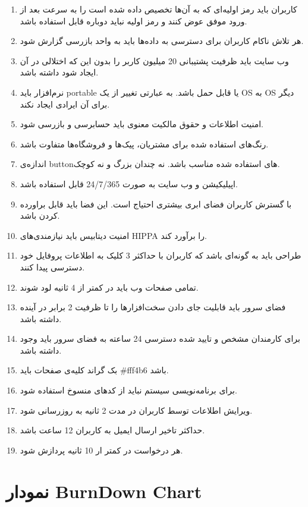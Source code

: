 \documentclass[]{article}
\begin{document}
\begin{enumerate}
\def\labelenumi{\arabic{enumi})}
\item
  کاربران باید رمز اولیه‌ای که به آن‌ها تخصیص داده شده است را به سرعت
  بعد از ورود موفق عوض کنند و رمز اولیه نباید دوباره قابل استفاده باشد.
\item
  هر تلاش ناکام کاربران برای دسترسی به داده‌ها باید به واحد بازرسی گزارش
  شود.
\item
  وب سایت باید ظرفیت پشتیبانی 20 میلیون کاربر را بدون این که اختلالی در
  آن ایجاد شود داشته باشد.
\item
  نرم‌افزار باید portable یا قابل حمل باشد. به عبارتی تغییر از یک OS به
  OS دیگر برای آن ایرادی ایجاد نکند.
\item
  امنیت اطلاعات و حقوق مالکیت معنوی باید حسابرسی و بازرسی شود.
\item
  رنگ‌های استفاده شده برای مشتریان، پیک‌ها و فروشگاه‌ها متفاوت باشد.
\item
  اندازه‌ی buttonهای استفاده شده مناسب باشد. نه چندان بزرگ و نه کوچک.
\item
  اپیلیکیشن و وب سایت به صورت 24/7/365 قابل استفاده باشد.
\item
  با گسترش کاربران فضای ابری بیشتری احتیاج است. این فضا باید قابل
  براورده کردن باشد.
\item
  امنیت دیتابیس باید نیازمندی‌های HIPPA را برآورد کند.
\item
  طراحی باید به گونه‌ای باشد که کاربران با حداکثر 3 کلیک به اطلاعات
  پروفایل خود دسترسی پیدا کنند.
\item
  تمامی صفحات وب باید در کمتر از 4 ثانیه لود شوند.
\item
  فضای سرور باید قابلیت جای دادن سخت‌افزارها را تا ظرفیت 2 برابر در
  آینده داشته باشد.
\item
  برای کارمندان مشخص و تایید شده دسترسی 24 ساعته به فضای سرور باید وجود
  داشته باشد.
\item
  بک گراند کلیه‌ی صفحات باید \#fff4b6 باشد.
\item
  برای برنامه‌نویسی سیستم نباید از کدهای منسوخ استفاده شود.
\item
  ویرایش اطلاعات توسط کاربران در مدت 2 ثانیه به روزرسانی شود.
\item
  حداکثر تاخیر ارسال ایمیل به کاربران 12 ساعت باشد.
\item
  هر درخواست در کمتر ار 10 ثانیه پردازش شود.
\end{enumerate}

\section{نمودار BurnDown
Chart}\label{ux646ux645ux648ux62fux627ux631-burndown-chart}
\end{document}
